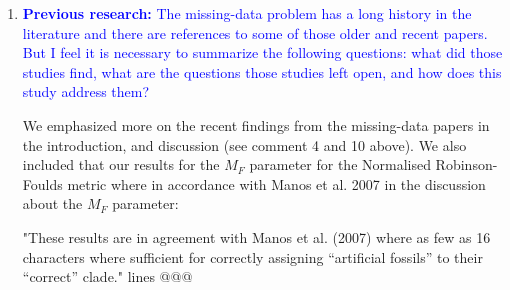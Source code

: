 \documentclass[12pt,letterpaper]{article}
\begin{document}
\begin{enumerate}

\item{\textcolor{blue}{\textbf{Previous research:} The missing-data problem has a long history in the literature and there are references to some of those older and recent papers.
But I feel it is necessary to summarize the following questions: what did those studies find, what are the questions those studies left open, and how does this study address them?}}

We emphasized more on the recent findings from the missing-data papers in the introduction, and discussion (see comment 4 and 10 above).
We also included that our results for the $M_F$ parameter for the Normalised Robinson-Foulds metric where in accordance with Manos et al. 2007 in the discussion about the $M_F$ parameter:

"These results are in agreement with Manos et al. (2007) where as few as 16 characters where sufficient for correctly assigning ``artificial fossils'' to their ``correct'' clade." lines @@@


\end{enumerate}
\end{document}
